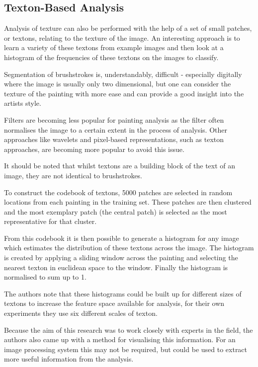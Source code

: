 \documentclass[conference]{IEEEtran}
\begin{document}
\subsection{Texton-Based Analysis}

Analysis of texture can also be performed with the help of a set of small
patches, or textons, relating to the texture of the image. An interesting
approach is to learn a variety of these textons from example images and then
look at a histogram of the frequencies of these textons on the images to
classify\cite{van2010texton}.

Segmentation of brushstrokes is, understandably, difficult - especially
digitally where the image is usually only two dimensional, but one can consider
the texture of the painting with more ease and can provide a good insight into
the artists style.

Filters are becoming less popular for painting analysis as the filter often
normalises the image to a certain extent in the process of analysis. Other
approaches like wavelets and pixel-based representations, such as texton
approaches, are becoming more popular to avoid this issue.

It should be noted that whilst textons are a building block of the text of an
image, they are not identical to brushstrokes.

To construct the codebook of textons, 5000 patches are selected in random
locations from each painting in the training set. These patches are then
clustered and the most exemplary patch (the central patch) is selected as the
most representative for that cluster.

From this codebook it is then possible to generate a histogram for any image
which estimates the distribution of these textons across the image. The
histogram is created by applying a sliding window across the painting and
selecting the nearest texton in euclidean space to the window. Finally the
histogram is normalised to sum up to 1.

The authors note that these histograms could be built up for different sizes of
textons to increase the feature space available for analysis, for their own
experiments they use six different scales of texton.

Because the aim of this research was to work closely with experts in the field,
the authors also came up with a method for visualising this information. For an
image processing system this may not be required, but could be used to extract
more useful information from the analysis.
\end{document}
